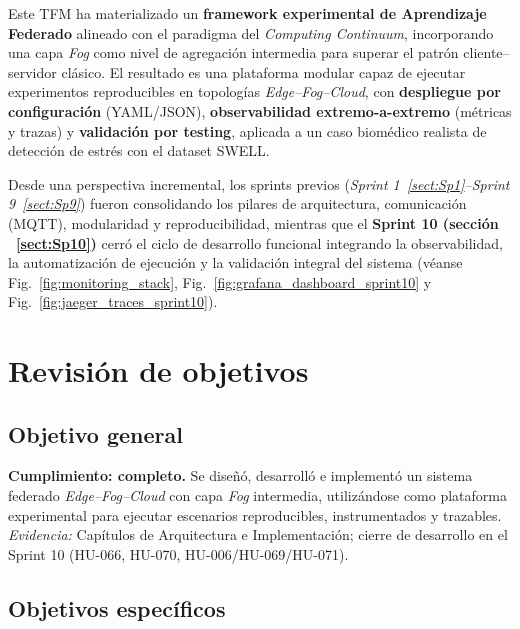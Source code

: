 \documentclass{report}
\begin{document}
Este TFM ha materializado un \textbf{framework experimental de Aprendizaje Federado} alineado con el paradigma del \textit{Computing Continuum}, incorporando una capa \textit{Fog} como nivel de agregación intermedia para superar el patrón cliente--servidor clásico. El resultado es una plataforma modular capaz de ejecutar experimentos reproducibles en topologías \textit{Edge--Fog--Cloud}, con \textbf{despliegue por configuración} (YAML/JSON), \textbf{observabilidad extremo-a-extremo} (métricas y trazas) y \textbf{validación por testing}, aplicada a un caso biomédico realista de detección de estrés con el dataset SWELL.

Desde una perspectiva incremental, los sprints previos (\textit{Sprint 1~\ref{sect:Sp1}--Sprint 9~\ref{sect:Sp9}}) fueron consolidando los pilares de arquitectura, comunicación (MQTT), modularidad y reproducibilidad, mientras que el \textbf{Sprint 10 (sección ~\ref{sect:Sp10})} cerró el ciclo de desarrollo funcional integrando la observabilidad, la automatización de ejecución y la validación integral del sistema (véanse Fig.~\ref{fig:monitoring_stack}, Fig.~\ref{fig:grafana_dashboard_sprint10} y Fig.~\ref{fig:jaeger_traces_sprint10}).

\vspace{0.35em}
\section{Revisión de objetivos}
\label{sec:revision_objetivos}
\vspace{0.25em}
\subsection*{Objetivo general}
\textbf{Cumplimiento: completo.} Se diseñó, desarrolló e implementó un sistema federado \textit{Edge--Fog--Cloud} con capa \textit{Fog} intermedia, utilizándose como plataforma experimental para ejecutar escenarios reproducibles, instrumentados y trazables.  
\textit{Evidencia:} Capítulos de Arquitectura e Implementación; cierre de desarrollo en el Sprint 10 (HU-066, HU-070, HU-006/HU-069/HU-071).

\vspace{0.35em}
\subsection*{Objetivos específicos}
\end{document}
